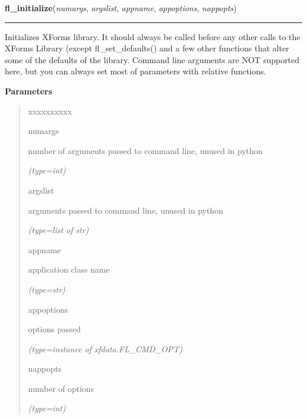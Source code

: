 \hspace{.8\funcindent}\begin{boxedminipage}{\funcwidth}

    \raggedright \textbf{fl\_initialize}(\textit{numargs}, \textit{argslist}, \textit{appname}, \textit{appoptions}, \textit{nappopts})

    \vspace{-1.5ex}

    \rule{\textwidth}{0.5\fboxrule}
\setlength{\parskip}{2ex}
    Initializes XForms library. It should always be called before any other
    calls to the XForms Library (except fl\_set\_defaults() and a few other
    functions that alter some of the defaults of the library. Command line 
    arguments are NOT supported here, but you can always set most of 
    parameters with relative functions.

\setlength{\parskip}{1ex}
      \textbf{Parameters}
      \vspace{-1ex}

      \begin{quote}
        \begin{Ventry}{xxxxxxxxxx}

          \item[numargs]

          number of arguments passed to command line, unused in python

            {\it (type=int)}

          \item[argslist]

          arguments passed to command line, unused in python

            {\it (type=list of str)}

          \item[appname]

          application class name

            {\it (type=str)}

          \item[appoptions]

          options passed

            {\it (type=instance of xfdata.FL\_CMD\_OPT)}

          \item[nappopts]

          number of options

            {\it (type=int)}

        \end{Ventry}


\end{quote}
\end{boxedminipage}
